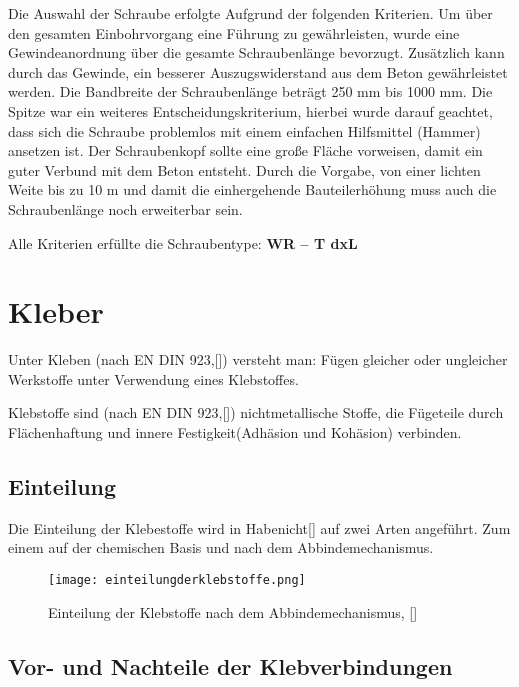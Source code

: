 \documentclass[12 pt,a4 paper ]{scrreprt}
\begin{document}
Die Auswahl der Schraube erfolgte Aufgrund der folgenden Kriterien.
Um über den gesamten Einbohrvorgang eine Führung zu gewährleisten, wurde eine Gewindeanordnung über die gesamte Schraubenlänge bevorzugt. Zusätzlich kann durch das Gewinde, ein besserer Auszugswiderstand aus dem Beton gewährleistet werden. Die Bandbreite der Schraubenlänge beträgt 250 mm bis 1000 mm.
Die Spitze war ein weiteres Entscheidungskriterium, hierbei wurde darauf geachtet, dass sich die Schraube problemlos mit einem einfachen Hilfsmittel (Hammer) ansetzen ist. 
Der Schraubenkopf sollte eine große Fläche vorweisen, damit ein guter  Verbund mit dem Beton entsteht. 
Durch die Vorgabe, von einer lichten Weite bis zu 10 m und damit die einhergehende Bauteilerhöhung muss auch die Schraubenlänge noch erweiterbar sein.
\newline{}

Alle Kriterien erfüllte die Schraubentype: \textbf{WR – T dxL} 




\section{Kleber}
Unter Kleben (nach EN DIN 923,[]) versteht man: Fügen gleicher oder ungleicher Werkstoffe unter Verwendung eines Klebstoffes. 

Klebstoffe sind (nach EN DIN 923,[]) nichtmetallische Stoffe, die Fügeteile durch Flächenhaftung und innere Festigkeit(Adhäsion und Kohäsion) verbinden.


\subsection{Einteilung}

Die Einteilung der Klebestoffe wird in Habenicht[] auf zwei Arten angeführt. Zum einem auf der chemischen Basis und nach dem Abbindemechanismus. 
\begin{figure}[h]
\begin{center}
\texttt{[image: einteilungderklebstoffe.png]}
\caption{ Einteilung der Klebstoffe nach dem Abbindemechanismus, []}
\label{Einteilung der Kelbstoffe}
\end{center}
\end{figure}


\subsection{Vor- und Nachteile der Klebverbindungen}
\end{document}
